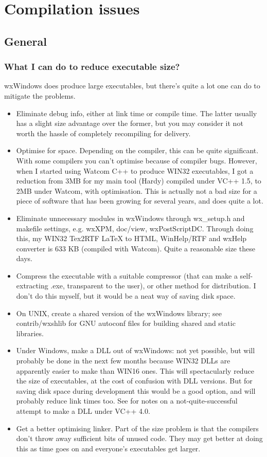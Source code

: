 \chapter{Compilation issues}

\section{General}

\subsection{What I can do to reduce executable size?}

wxWindows does produce large executables, but there's quite a lot
one can do to mitigate the problems.

\begin{itemize}\itemsep=0pt
\item Eliminate debug info, either at link time or compile time. The latter usually
has a slight size advantage over the former, but you may consider it not
worth the hassle of completely recompiling for delivery.
\item Optimise for space. Depending on the compiler, this can be quite significant.
With some compilers you can't optimise because of compiler bugs. However,
when I started using Watcom C++ to produce WIN32 executables, I got
a reduction from 3MB for my main tool (Hardy) compiled under VC++ 1.5,
to 2MB under Watcom, with optimisation. This is actually not a bad size for
a piece of software that has been growing for several years, and does
quite a lot.
\item Eliminate unnecessary modules in wxWindows through wx\_setup.h
and makefile settings, e.g. wxXPM, doc/view, wxPostScriptDC.
Through doing this, my WIN32 Tex2RTF LaTeX to HTML, WinHelp/RTF and wxHelp
converter is 633 KB (compiled with Watcom). Quite a reasonable
size these days.
\item Compress the executable with a suitable compressor (that can
make a self-extracting .exe, transparent to the user), or other
method for distribution. I don't do this myself, but it would be a neat way of
saving disk space.
\item On UNIX, create a shared version of the wxWindows library; see
contrib/wxshlib for GNU autoconf files for building shared and
static libraries.
\item Under Windows, make a DLL out of wxWindows: not yet possible, but will probably
be done in the next few months because WIN32 DLLs are apparently
easier to make than WIN16 ones. This will spectacularly reduce the
size of executables, at the cost of confusion with DLL versions.
But for saving disk space during development this would be a good option,
and will probably reduce link times too. See  for notes on
a not-quite-successful attempt to make a DLL under VC++ 4.0.
\item Get a better optimising linker. Part of the size problem is that the
compilers don't throw away sufficient bits of unused code. They may
get better at doing this as time goes on and everyone's executables
get larger.
\end{itemize}

